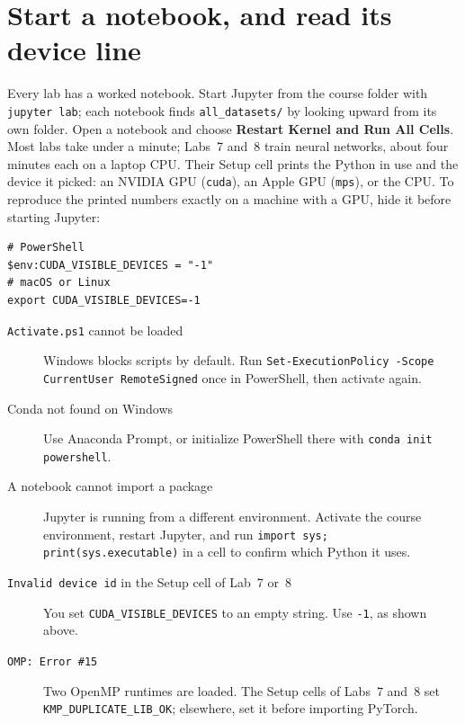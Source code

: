 \section{Start a notebook, and read its device line}

Every lab has a worked notebook. Start Jupyter from the course folder with \texttt{jupyter lab}; each notebook finds \texttt{all\_datasets/} by looking upward from its own folder. Open a notebook and choose \textbf{Restart Kernel and Run All Cells}. Most labs take under a minute; Labs~7 and~8 train neural networks, about four minutes each on a laptop CPU. Their Setup cell prints the Python in use and the device it picked: an NVIDIA GPU (\texttt{cuda}), an Apple GPU (\texttt{mps}), or the CPU. To reproduce the printed numbers exactly on a machine with a GPU, hide it before starting Jupyter:

\begin{lstlisting}[style=utpterminal]
# PowerShell
$env:CUDA_VISIBLE_DEVICES = "-1"
# macOS or Linux
export CUDA_VISIBLE_DEVICES=-1
\end{lstlisting}

\begin{troubleshoot}
\begin{description}
  \item[\texttt{Activate.ps1} cannot be loaded] Windows blocks scripts by default. Run \texttt{Set-ExecutionPolicy -Scope CurrentUser RemoteSigned} once in PowerShell, then activate again.
  \item[Conda not found on Windows] Use Anaconda Prompt, or initialize PowerShell there with \texttt{conda init powershell}.
  \item[A notebook cannot import a package] Jupyter is running from a different environment. Activate the course environment, restart Jupyter, and run \texttt{import sys; print(sys.executable)} in a cell to confirm which Python it uses.
  \item[\texttt{Invalid device id} in the Setup cell of Lab~7 or~8] You set \texttt{CUDA\_VISIBLE\_DEVICES} to an empty string. Use \texttt{-1}, as shown above.
  \item[\texttt{OMP: Error \#15}] Two OpenMP runtimes are loaded. The Setup cells of Labs~7 and~8 set \texttt{KMP\_DUPLICATE\_LIB\_OK}; elsewhere, set it before importing PyTorch.
\end{description}
\end{troubleshoot}
